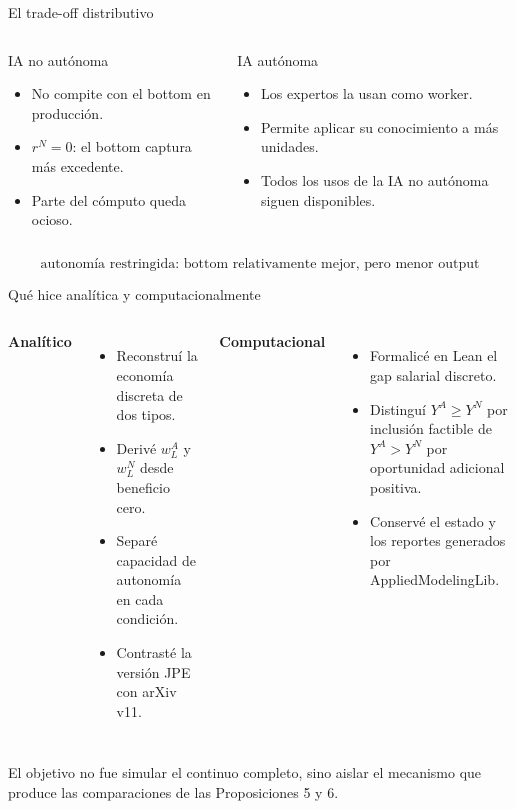 \documentclass[aspectratio=169,11pt]{beamer}
\newcommand{\clave}[1]{\textcolor{Petroleo}{\textbf{#1}}}
\begin{document}
\begin{frame}{El trade-off distributivo}
\begin{columns}[T,onlytextwidth]
\begin{block}{IA no aut\'onoma}
\begin{itemize}\small
\item No compite con el bottom en producci\'on.
\item $r^N=0$: el bottom captura m\'as excedente.
\item Parte del c\'omputo queda ocioso.
\end{itemize}
\end{block}
\begin{block}{IA aut\'onoma}
\begin{itemize}\small
\item Los expertos la usan como worker.
\item Permite aplicar su conocimiento a m\'as unidades.
\item Todos los usos de la IA no aut\'onoma siguen disponibles.
\end{itemize}
\end{block}
\end{columns}
\centering
\[\boxed{\text{autonom\'ia restringida: bottom relativamente mejor, pero menor output}}\]
\end{frame}

\begin{frame}{Qu\'e hice anal\'itica y computacionalmente}
\begin{columns}[T,onlytextwidth]
\clave{Anal\'itico}
\begin{itemize}\small
\item Reconstru\'i la econom\'ia discreta de dos tipos.
\item Deriv\'e $w_L^A$ y $w_L^N$ desde beneficio cero.
\item Separ\'e capacidad de autonom\'ia en cada condici\'on.
\item Contrast\'e la versi\'on JPE con arXiv v11.
\end{itemize}
\clave{Computacional}
\begin{itemize}\small
\item Formalic\'e en Lean el gap salarial discreto.
\item Distingu\'i $Y^A\ge Y^N$ por inclusi\'on factible de $Y^A>Y^N$ por oportunidad adicional positiva.
\item Conserv\'e el estado y los reportes generados por AppliedModelingLib.
\end{itemize}
\end{columns}
\vspace{0.15cm}
{\small\color{Gris}El objetivo no fue simular el continuo completo, sino aislar el mecanismo que produce las comparaciones de las Proposiciones 5 y 6.}
\end{frame}
\end{document}

